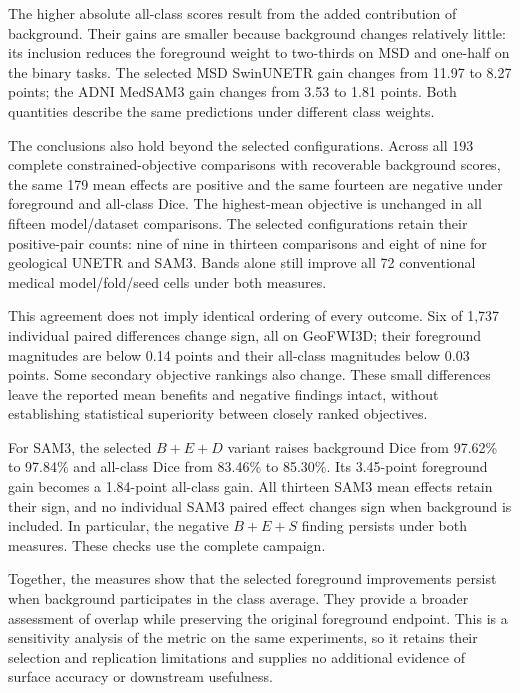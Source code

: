 \documentclass[12pt,a4paper]{article}
\begin{document}
The higher absolute all-class scores result from the added contribution
of background. Their gains are smaller because background changes
relatively little: its inclusion reduces the foreground weight to
two-thirds on MSD and one-half on the binary tasks. The selected
MSD SwinUNETR gain changes from 11.97 to 8.27 points; the ADNI
MedSAM3 gain changes from 3.53 to 1.81 points. Both quantities describe
the same predictions under different class weights.

The conclusions also hold beyond the selected configurations. Across
all 193 complete constrained-objective comparisons with recoverable
background scores, the same 179 mean effects are positive and the
same fourteen are negative under foreground and all-class Dice.
The highest-mean objective is unchanged in all fifteen model/dataset
comparisons. The selected configurations retain their positive-pair
counts: nine of nine in thirteen comparisons and eight of nine for
geological UNETR and SAM3. Bands alone still improve all 72 conventional medical
model/fold/seed cells under both measures.

This agreement does not imply identical ordering of every outcome.
Six of 1,737 individual paired differences change sign, all on
GeoFWI3D; their foreground magnitudes are below 0.14 points and
their all-class magnitudes below 0.03 points. Some secondary objective
rankings also change. These small differences leave the reported
mean benefits and negative findings intact, without establishing
statistical superiority between closely ranked objectives.

For SAM3, the selected $B+E+D$ variant raises background Dice
from 97.62\% to 97.84\% and all-class Dice from 83.46\% to
85.30\%. Its 3.45-point foreground gain becomes a 1.84-point
all-class gain. All thirteen SAM3 mean effects retain their sign,
and no individual SAM3 paired effect changes sign when background
is included. In particular, the negative $B+E+S$ finding persists
under both measures. These checks use the complete campaign.

Together, the measures show that the selected foreground improvements
persist when background participates in the class average. They provide
a broader assessment of overlap while preserving the original
foreground endpoint. This is a sensitivity analysis of the metric on
the same experiments, so it retains their selection and replication
limitations and supplies no additional evidence of surface accuracy
or downstream usefulness.
\FloatBarrier
\end{document}
